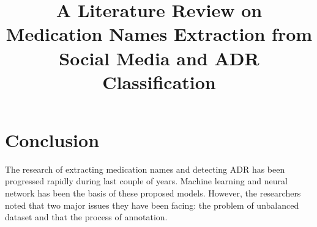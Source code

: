\documentclass[12pt,conference]{IEEEtran}
\begin{document}
	
	\title{A Literature Review on Medication Names Extraction from Social Media and ADR Classification}
	
	\author{
	}
	
	\maketitle
	
	
	
	
	
	
	
	
	
	
	
	
		
	\section{Conclusion}
		The research of extracting medication names and detecting ADR has been progressed rapidly during last couple of years. Machine learning and neural network has been the basis of these proposed models. However, the researchers noted that two major issues they have been facing: the problem of unbalanced dataset and that the process of annotation. 
	
	
	
\end{document}
